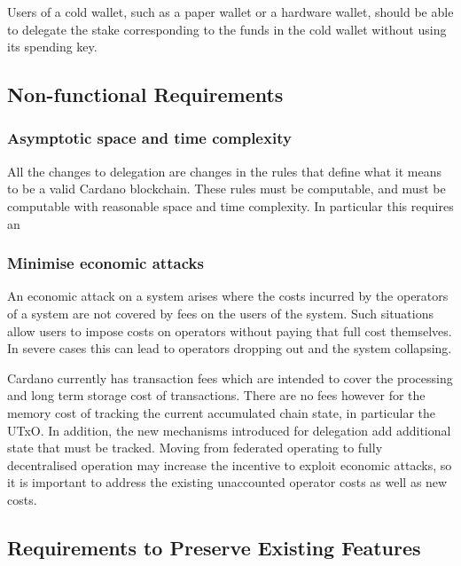 \documentclass[11pt,a4paper]{article}
\begin{document}
Users of a cold wallet, such as a paper wallet or a hardware wallet,
should be able to delegate the stake corresponding to the funds in the
cold wallet without using its spending key.

\subsection{Non-functional
Requirements}\label{non-functional-requirements}

\subsubsection{Asymptotic space and time
complexity}\label{asymptotic-space-and-time-complexity}

All the changes to delegation are changes in the rules that define what
it means to be a valid Cardano blockchain. These rules must be
computable, and must be computable with reasonable space and time
complexity. In particular this requires an

\subsubsection{Minimise economic
attacks}\label{minimise-economic-attacks}

An economic attack on a system arises where the costs incurred by the
operators of a system are not covered by fees on the users of the
system. Such situations allow users to impose costs on operators without
paying that full cost themselves. In severe cases this can lead to
operators dropping out and the system collapsing.

Cardano currently has transaction fees which are intended to cover the
processing and long term storage cost of transactions. There are no fees
however for the memory cost of tracking the current accumulated chain
state, in particular the UTxO. In addition, the new mechanisms
introduced for delegation add additional state that must be tracked.
Moving from federated operating to fully decentralised operation may
increase the incentive to exploit economic attacks, so it is important
to address the existing unaccounted operator costs as well as new costs.

\subsection{Requirements to Preserve Existing
Features}\label{requirements-to-preserve-existing-features}
\end{document}
